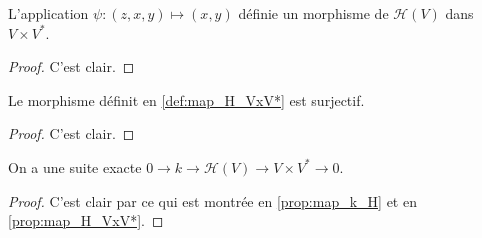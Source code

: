 \begin{definition}
    \label{def:map_H_VxV*}
    \leanok 

    L'application $\psi:(z,x,y)\mapsto (x,y)$ définie un morphisme de 
    $\mathcal{H}(V)$ dans $V\times V^*$.
    \begin{proof}
        \leanok
        C'est clair.
    \end{proof}
\end{definition}

\begin{proposition}[]
    \label{prop:surj_map_H_VxV*}
    \leanok 

    Le morphisme définit en \ref{def:map_H_VxV*} est surjectif.
    \begin{proof}
        \leanok
        C'est clair.
    \end{proof}
\end{proposition}

\begin{proposition}
    \label{exact_seq_h}
    \leanok 

    On a une suite exacte $0\rightarrow k \rightarrow \mathcal{H}(V) \rightarrow
    V\times V^* \rightarrow 0$.
    \begin{proof}
        \leanok
        C'est clair par ce qui est montrée en \ref{prop:map_k_H} et en \ref{prop:map_H_VxV*}.
    \end{proof}
\end{proposition}
    